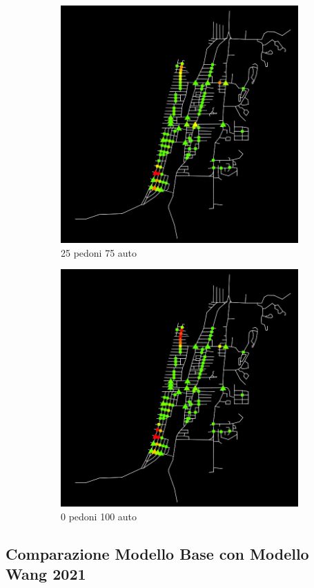 \begin{figure}
    \begin{subfigure}{0.475\textwidth}
        \centering
        \includegraphics[width=\textwidth]{images/analisi/comparison-car-delay-25-75.png}
        \caption{25 pedoni 75 auto}
    \end{subfigure}
    \begin{subfigure}{0.475\textwidth}
        \centering
        \includegraphics[width=\textwidth]{images/analisi/comparison-car-delay-0-100.png}
        \caption{0 pedoni 100 auto}
    \end{subfigure}
    \caption{}
    \label{fig:analisi-comparison-car-delay}
\end{figure}

\subsection*{Comparazione Modello Base con Modello Wang 2021}

